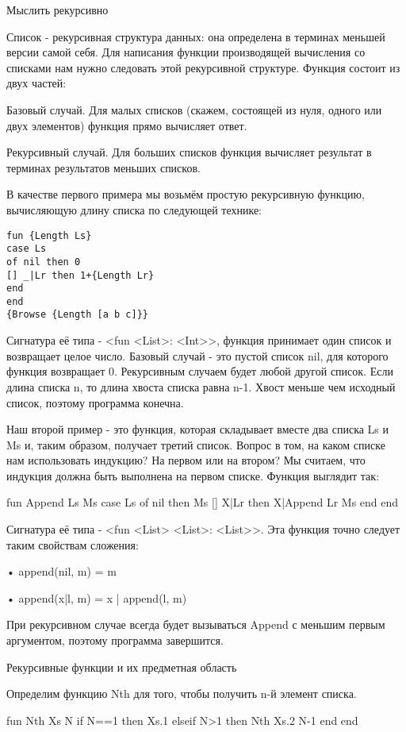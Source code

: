 Мыслить рекурсивно

Список - рекурсивная структура данных: она определена в терминах меньшей версии самой себя. Для написания функции производящей вычисления со списками нам нужно следовать этой рекурсивной структуре. Функция состоит из двух частей:

Базовый случай. Для малых списков (скажем, состоящей из нуля, одного или двух элементов) функция прямо вычисляет ответ.

Рекурсивный случай. Для больших списков функция вычисляет результат в терминах результатов меньших списков.

В качестве первого примера мы возьмём простую рекурсивную функцию, вычисляющую длину списка по следующей технике:

\begin{lstlisting}
fun {Length Ls}
case Ls
of nil then 0
[] _|Lr then 1+{Length Lr}
end
end
{Browse {Length [a b c]}}
\end{lstlisting}

Сигнатура её типа - <fun { <List>}: <Int>>, функция принимает один список и возвращает целое число. Базовый случай - это пустой список nil, для которого функция возвращает 0. Рекурсивным случаем будет любой другой список. Если длина списка n, то длина хвоста списка равна n-1. Хвост меньше чем исходный список, поэтому программа конечна.

Наш второй пример - это функция, которая складывает вместе два списка Ls и Ms и, таким образом, получает третий список. Вопрос в том, на каком списке нам использовать индукцию? На первом или на втором? Мы считаем, что индукция должна быть выполнена на первом списке. Функция выглядит так:

fun {Append Ls Ms}
case Ls
of nil then Ms
[] X|Lr then X|{Append Lr Ms}
end
end

Сигнатура её типа - <fun { <List> <List>}: <List>>. Эта функция точно следует таким свойствам сложения:

• append(nil, m) = m

• append(x|l, m) = x | append(l, m)

При рекурсивном случае всегда будет вызываться Append с меньшим первым аргументом, поэтому программа завершится.

Рекурсивные функции и их предметная область

Определим функцию Nth для того, чтобы получить n-й элемент списка.

fun {Nth Xs N}
if N==1 then Xs.1
elseif N>1 then {Nth Xs.2 N-1}
end
end

